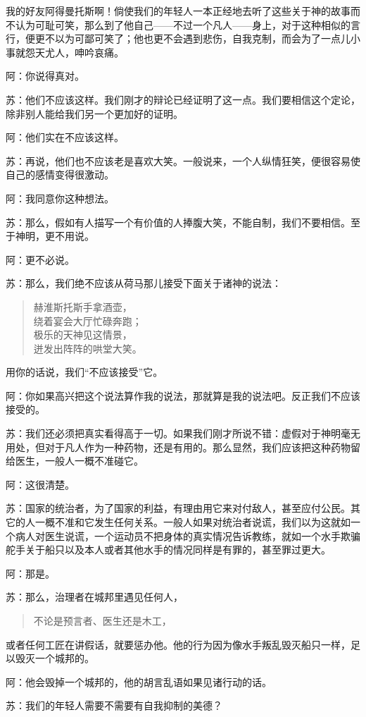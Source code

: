 \documentclass[11pt,oneside]{book}
\begin{document}
\begin{common-format}
我的好友阿得曼托斯啊！倘使我们的年轻人一本正经地去听了这些关于神的故事而不认为可耻可笑，那么到了他自己——不过一个凡人——身上，对于这种相似的言行，便更不以为可鄙可笑了；他也更不会遇到悲伤，自我克制，而会为了一点儿小事就怨天尤人，呻吟哀痛。

阿：你说得真对。

苏：他们不应该这样。我们刚才的辩论已经证明了这一点。我们要相信这个定论，除非别人能给我们另一个更加好的证明。

阿：他们实在不应该这样。

苏：再说，他们也不应该老是喜欢大笑。一般说来，一个人纵情狂笑，便很容易使自己的感情变得很激动。

阿：我同意你这种想法。

苏：那么，假如有人描写一个有价值的人捧腹大笑，不能自制，我们不要相信。至于神明，更不用说。

阿：更不必说。

苏：那么，我们绝不应该从荷马那儿接受下面关于诸神的说法：
\begin{verse}
赫淮斯托斯手拿酒壶，\\
绕着宴会大厅忙碌奔跑；\\
极乐的天神见这情景，\\
迸发出阵阵的哄堂大笑。
\end{verse}
用你的话说，我们“不应该接受”它。

阿：你如果高兴把这个说法算作我的说法，那就算是我的说法吧。反正我们不应该接受的。

苏：我们还必须把真实看得高于一切。如果我们刚才所说不错：虚假对于神明毫无用处，但对于凡人作为一种药物，还是有用的。那么显然，我们应该把这种药物留给医生，一般人一概不准碰它。

阿：这很清楚。

苏：国家的统治者，为了国家的利益，有理由用它来对付敌人，甚至应付公民。其它的人一概不准和它发生任何关系。一般人如果对统治者说谎，我们以为这就如一个病人对医生说谎，一个运动员不把身体的真实情况告诉教练，就如一个水手欺骗舵手关于船只以及本人或者其他水手的情况同样是有罪的，甚至罪过更大。

阿：那是。

苏：那么，治理者在城邦里遇见任何人，
\begin{verse}
不论是预言者、医生还是木工，
\end{verse}
或者任何工匠在讲假话，就要惩办他。他的行为因为像水手叛乱毁灭船只一样，足以毁灭一个城邦的。

阿：他会毁掉一个城邦的，他的胡言乱语如果见诸行动的话。

苏：我们的年轻人需要不需要有自我抑制的美德？


\end{common-format}
\end{document}
